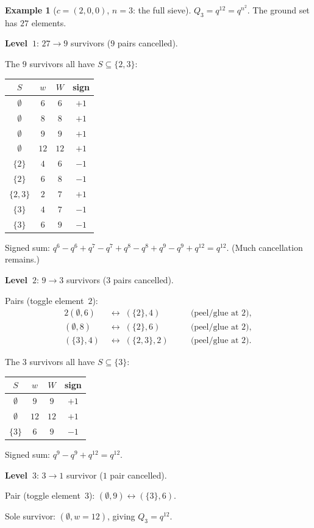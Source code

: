 \documentclass[11pt]{article}
\theoremstyle{plain}
\theoremstyle{definition}
\newtheorem{example}[theorem]{Example}
\begin{document}
\begin{example}[$c = (2,0,0)$, $n = 3$: the full sieve]
\label{ex:RR-n3}
$Q_3 = q^{12} = q^{n^2}$.  The ground set has $27$
elements.

\medskip\noindent
\textbf{Level~$1$}: $27 \to 9$ survivors ($9$ pairs
cancelled).

The $9$ survivors all have $S \subseteq \{2, 3\}$:
\begin{center}
\begin{tabular}{c|c|c|c}
$S$ & $w$ & $W$ & sign \\ \hline
$\emptyset$ & $6$ & $6$ & $+1$ \\
$\emptyset$ & $8$ & $8$ & $+1$ \\
$\emptyset$ & $9$ & $9$ & $+1$ \\
$\emptyset$ & $12$ & $12$ & $+1$ \\
$\{2\}$ & $4$ & $6$ & $-1$ \\
$\{2\}$ & $6$ & $8$ & $-1$ \\
$\{2,3\}$ & $2$ & $7$ & $+1$ \\
$\{3\}$ & $4$ & $7$ & $-1$ \\
$\{3\}$ & $6$ & $9$ & $-1$
\end{tabular}
\end{center}

\noindent
Signed sum: $q^6 - q^6 + q^7 - q^7 + q^8 - q^8
+ q^9 - q^9 + q^{12} = q^{12}$.  (Much cancellation
remains.)

\medskip\noindent
\textbf{Level~$2$}: $9 \to 3$ survivors ($3$ pairs
cancelled).

Pairs (toggle element~$2$):
\begin{alignat*}{2}
  (\emptyset, 6) &\;\leftrightarrow\;
    (\{2\}, 4) &\quad& \text{(peel/glue at $2$)}, \\
  (\emptyset, 8) &\;\leftrightarrow\;
    (\{2\}, 6) &\quad& \text{(peel/glue at $2$)}, \\
  (\{3\}, 4) &\;\leftrightarrow\;
    (\{2,3\}, 2) &\quad& \text{(peel/glue at $2$)}.
\end{alignat*}

The $3$ survivors all have $S \subseteq \{3\}$:
\begin{center}
\begin{tabular}{c|c|c|c}
$S$ & $w$ & $W$ & sign \\ \hline
$\emptyset$ & $9$ & $9$ & $+1$ \\
$\emptyset$ & $12$ & $12$ & $+1$ \\
$\{3\}$ & $6$ & $9$ & $-1$
\end{tabular}
\end{center}

\noindent
Signed sum: $q^9 - q^9 + q^{12} = q^{12}$.

\medskip\noindent
\textbf{Level~$3$}: $3 \to 1$ survivor ($1$ pair
cancelled).

Pair (toggle element~$3$):
$(\emptyset, 9) \leftrightarrow (\{3\}, 6)$.

Sole survivor: $(\emptyset, w{=}12)$, giving
$Q_3 = q^{12}$.
\end{example}
\end{document}
